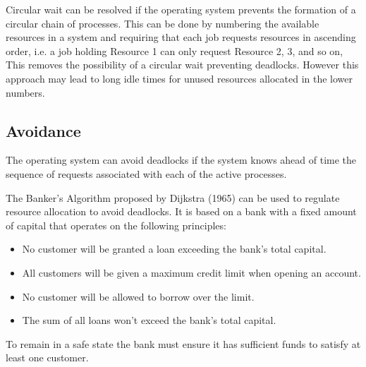 \documentclass[12pt letter]{report}
\begin{document}
Circular wait can be resolved if the operating system prevents the
formation of a circular chain of processes. This can be done by
numbering the available resources
in a system and requiring that each job requests resources in
ascending order, i.e. a job holding Resource 1 can only request
Resource 2, 3, and so on, This removes the possibility of a circular
wait preventing deadlocks. However this approach may lead to long
idle times for unused resources allocated in the lower numbers.

\subsection{Avoidance}

The operating system can avoid deadlocks if the system knows ahead of
time the sequence of requests associated with each of the active processes.

The Banker's Algorithm proposed by Dijkstra (1965) can be used to
regulate resource allocation to avoid deadlocks. It is based on a
bank with a fixed amount  of capital that operates on the following principles:
\begin{itemize}
  \item No customer will be granted a loan exceeding the bank's total capital.
  \item All customers will be given a maximum credit limit when
    opening an account.
  \item No customer will be allowed to borrow over the limit.
  \item The sum of all loans won't exceed the bank's total capital.
\end{itemize}

To remain in a safe state the bank must ensure it has sufficient
funds to satisfy at least one customer.
\end{document}
